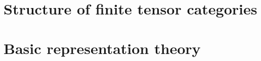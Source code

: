         
        
        
        
        
    
    \begin{appendices}
        \chapter{Structure of finite tensor categories}
            \begin{abstract}
            
            \end{abstract}
            
            \minitoc
        
            
            
            
            
        \chapter{Basic representation theory}
            \begin{abstract}
            
            \end{abstract}
            
            \minitoc
            
            
            
            
        
    \end{appendices}
	
	\printbibliography

